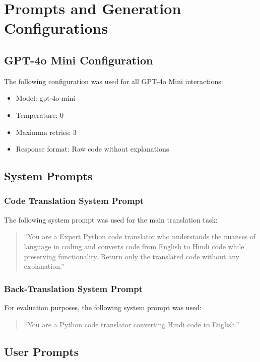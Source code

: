 \documentclass[11pt,a4paper]{article}
\begin{document}
\appendix
\label{sec:appendix}
\section{Prompts and Generation Configurations}

\subsection{GPT-4o Mini Configuration}
The following configuration was used for all GPT-4o Mini interactions:

\begin{itemize}
    \item Model: gpt-4o-mini
    \item Temperature: 0
    \item Maximum retries: 3
    \item Response format: Raw code without explanations
\end{itemize}

\subsection{System Prompts}
\subsubsection{Code Translation System Prompt}
The following system prompt was used for the main translation task:
\begin{quote}
``You are a Expert Python code translator who understands the nuanses of language in coding and converts code from English to Hindi code while preserving functionality. Return only the translated code without any explanation.''
\end{quote}

\subsubsection{Back-Translation System Prompt}
For evaluation purposes, the following system prompt was used:
\begin{quote}
``You are a Python code translator converting Hindi code to English.''
\end{quote}

\subsection{User Prompts}
\end{document}
